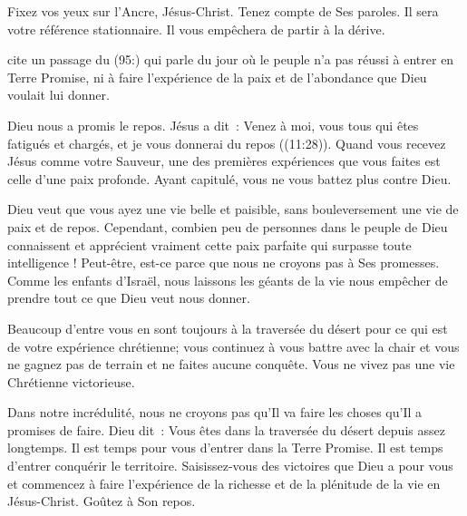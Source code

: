 Fixez vos yeux sur l'Ancre, Jésus-Christ. Tenez compte de Ses paroles.
 Il sera votre référence stationnaire.
 Il vous empêchera de partir à la dérive. 

\dvrule






 cite un passage du (95:) qui parle du jour où le peuple
 n'a pas réussi à entrer en Terre Promise, ni à faire l'expérience
 de la paix et de l'abondance que Dieu voulait lui donner. 

Dieu nous a promis le repos. Jésus a dit~: 
 \og Venez à moi, vous tous qui êtes fatigués et chargés,
 et je vous donnerai du repos \fg{} ((11:28)).
 Quand vous recevez Jésus comme votre Sauveur, une des premières expériences
 que vous faites est celle d'une paix profonde.
 Ayant capitulé, vous ne vous battez plus contre Dieu. 


Dieu veut que vous ayez une vie belle et paisible, sans bouleversement
 \ocadr une vie de paix et de repos.
 Cependant, combien peu de personnes dans le peuple de Dieu connaissent
 et apprécient vraiment cette paix parfaite qui surpasse toute intelligence !
 Peut-être,  est-ce parce que nous ne croyons pas
 à Ses promesses.
 Comme les enfants d'Israël, nous laissons les géants de la vie
 nous empêcher de prendre tout ce que Dieu veut nous donner. 

Beaucoup d'entre vous en sont toujours à la traversée du désert
 pour ce qui est de votre expérience chrétienne;
 vous continuez à vous battre avec la chair et vous ne gagnez pas de terrain
 et ne faites aucune conquête. Vous ne vivez pas
 une vie Chrétienne 
 victorieuse. 

Dans notre incrédulité, nous ne croyons pas qu'Il va faire les choses
 qu'Il a promises 
 de faire.
 Dieu dit~: 
 \og Vous êtes dans la traversée du désert depuis assez longtemps.
 Il est temps pour vous d'entrer dans la Terre Promise.
 Il est temps d'entrer conquérir le territoire. \fg{}
 Saisissez-vous 
 des victoires que Dieu a pour vous et commencez à faire l'expérience
 de la richesse et de la plénitude de la vie en Jésus-Christ.
 Goûtez à Son repos. 

